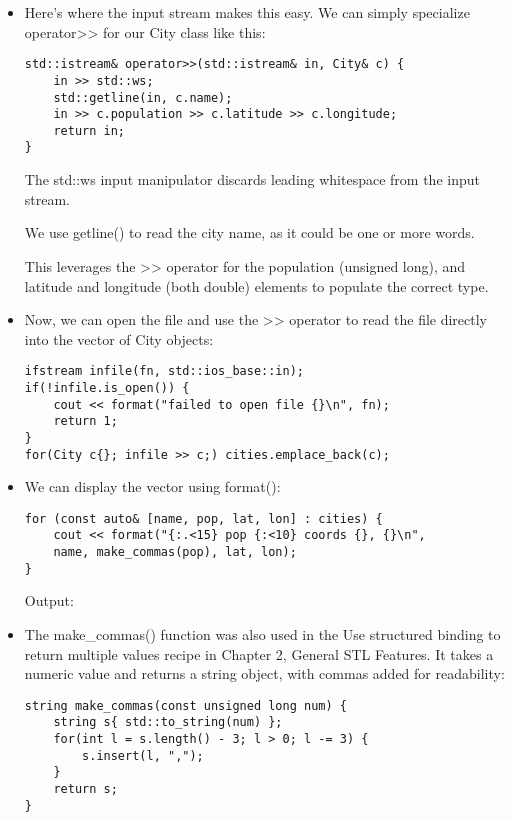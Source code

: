 \begin{itemize}
\item 
Here's where the input stream makes this easy. We can simply specialize operator>{}> for our City class like this:

\begin{lstlisting}[style=styleCXX]
std::istream& operator>>(std::istream& in, City& c) {
	in >> std::ws;
	std::getline(in, c.name);
	in >> c.population >> c.latitude >> c.longitude;
	return in;
}
\end{lstlisting}

The std::ws input manipulator discards leading whitespace from the input stream.

We use getline() to read the city name, as it could be one or more words.

This leverages the >{}> operator for the population (unsigned long), and latitude and longitude (both double) elements to populate the correct type.

\item 
Now, we can open the file and use the >{}> operator to read the file directly into the vector of City objects:

\begin{lstlisting}[style=styleCXX]
ifstream infile(fn, std::ios_base::in);
if(!infile.is_open()) {
	cout << format("failed to open file {}\n", fn);
	return 1;
}
for(City c{}; infile >> c;) cities.emplace_back(c);
\end{lstlisting}

\item 
We can display the vector using format():

\begin{lstlisting}[style=styleCXX]
for (const auto& [name, pop, lat, lon] : cities) {
	cout << format("{:.<15} pop {:<10} coords {}, {}\n",
	name, make_commas(pop), lat, lon);
}
\end{lstlisting}

Output:


\item 
The make\_commas() function was also used in the Use structured binding to return multiple values recipe in Chapter 2, General STL Features. It takes a numeric value and returns a string object, with commas added for readability:

\begin{lstlisting}[style=styleCXX]
string make_commas(const unsigned long num) {
	string s{ std::to_string(num) };
	for(int l = s.length() - 3; l > 0; l -= 3) {
		s.insert(l, ",");
	}
	return s;
}
\end{lstlisting}
\end{itemize}

